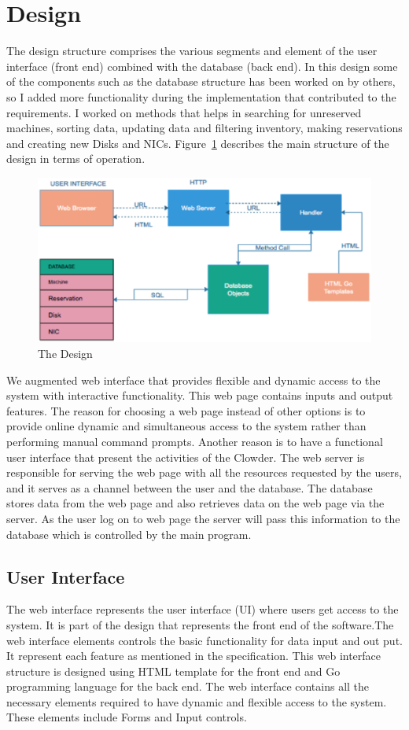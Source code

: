 \section{Design} \label{Designstructure}
The design structure comprises the various  segments and element of the user interface (front end) combined with the database (back end). In this design some of the components such as the database structure has been worked on by others, so I added more functionality during the implementation that contributed to the requirements. I worked on  methods that helps in searching for unreserved machines, sorting data, updating data and filtering inventory, making reservations and creating new Disks and NICs.  Figure~\ref{fig:Design} describes the main structure of the design in terms of operation.
\begin{figure}[h]
  \includegraphics[width=\linewidth]{Design.eps}
  \caption{The Design}
  \label{fig:Design}
\end{figure}
\pagebreak
We augmented web interface that provides  flexible and dynamic access to the system with interactive functionality. This web page contains inputs and output features. The reason for choosing a web page instead of other options is to provide online dynamic and simultaneous  access to the system rather than performing manual command prompts. Another reason is to have a functional user interface that present the activities of the Clowder. The web server is responsible for serving the web page with all the resources requested by the users, and it serves as a channel between the user and the database. The database stores data from the web page and also retrieves data on the web page via the server. As the user log on to web page the server will pass this information to the database which is controlled by the main program. 

\subsection{User Interface}
The web interface represents the user interface (UI) where users get access to the system. It is part of the design that represents the front end of the software.The web interface elements controls the basic functionality for data input and out put. It represent each feature as mentioned in the specification. This web interface structure is designed using  HTML template for the front end and Go programming language for the back end. 
The web interface contains all the necessary elements required to have dynamic and flexible access to the system. These elements include Forms and Input controls.
